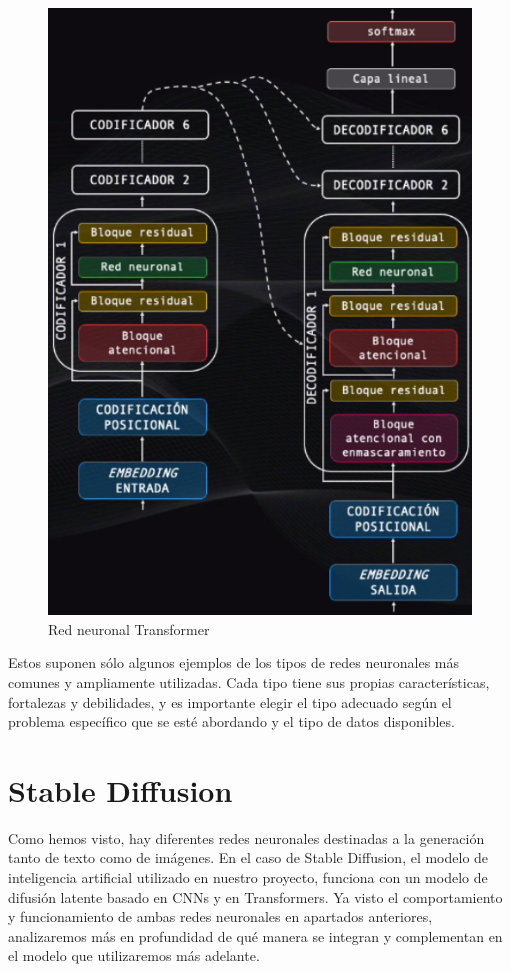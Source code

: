 \begin{figure}[h]
	\centering
	\includegraphics[width = 0.7 \textwidth]{Imagenes/Vectorial/transformer.png}
	\caption{Red neuronal Transformer \citep{transformers}}
	\label{fig:transformer}
\end{figure}

Estos suponen sólo algunos ejemplos de los tipos de redes neuronales más comunes y ampliamente utilizadas. Cada tipo tiene sus propias características, fortalezas y debilidades, y es importante elegir el tipo adecuado según el problema específico que se esté abordando y el tipo de datos disponibles.\\

 \section{Stable Diffusion}

Como hemos visto, hay diferentes redes neuronales destinadas a la generación tanto de texto como de imágenes. En el caso de Stable Diffusion, el modelo de inteligencia artificial utilizado en nuestro proyecto, funciona con un modelo de difusión latente basado en CNNs y en Transformers. Ya visto el comportamiento y funcionamiento de ambas redes neuronales en apartados anteriores, analizaremos más en profundidad de qué manera se integran y complementan en el modelo que utilizaremos más adelante.\\


